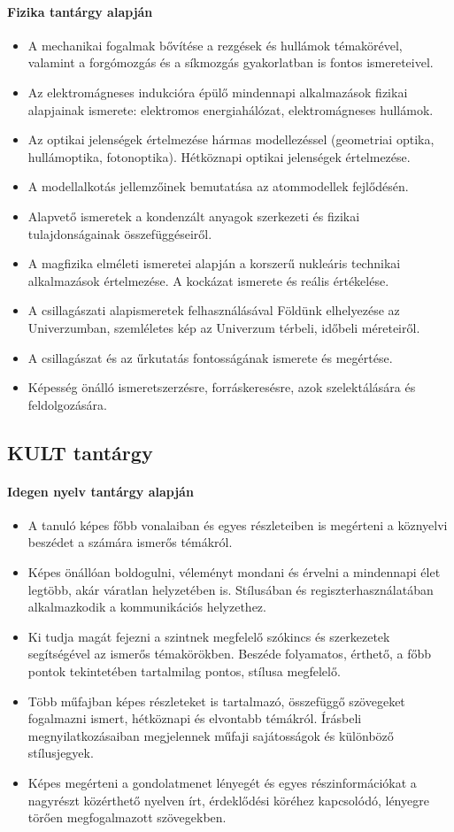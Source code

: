 \paragraph{Fizika tantárgy alapján}
\begin{itemize}
\item A mechanikai fogalmak bővítése a rezgések és hullámok témakörével, valamint a forgómozgás és a síkmozgás gyakorlatban is fontos ismereteivel.
\item Az elektromágneses indukcióra épülő mindennapi alkalmazások fizikai alapjainak ismerete: elektromos energiahálózat, elektromágneses hullámok.
\item Az optikai jelenségek értelmezése hármas modellezéssel (geometriai optika, hullámoptika, fotonoptika). Hétköznapi optikai jelenségek értelmezése.
\item A modellalkotás jellemzőinek bemutatása az atommodellek fejlődésén.
\item Alapvető ismeretek a kondenzált anyagok szerkezeti és fizikai tulajdonságainak összefüggéseiről.
\item A magfizika elméleti ismeretei alapján a korszerű nukleáris technikai alkalmazások értelmezése. A kockázat ismerete és reális értékelése.
\item A csillagászati alapismeretek felhasználásával Földünk elhelyezése az Univerzumban, szemléletes kép az Univerzum térbeli, időbeli méreteiről.
\item A csillagászat és az űrkutatás fontosságának ismerete és megértése.
\item Képesség önálló ismeretszerzésre, forráskeresésre, azok szelektálására és feldolgozására.
\end{itemize}
\subsection{KULT tantárgy}
\paragraph{Idegen nyelv tantárgy alapján}
\begin{itemize}
\item A tanuló képes főbb vonalaiban és egyes részleteiben is megérteni a köznyelvi beszédet a számára ismerős témákról.
\item Képes önállóan boldogulni, véleményt mondani és érvelni a mindennapi élet legtöbb, akár váratlan helyzetében is. Stílusában és regiszterhasználatában alkalmazkodik a kommunikációs helyzethez.
\item Ki tudja magát fejezni a szintnek megfelelő szókincs és szerkezetek segítségével az ismerős témakörökben. Beszéde folyamatos, érthető, a főbb pontok tekintetében tartalmilag pontos, stílusa megfelelő.
\item Több műfajban képes részleteket is tartalmazó, összefüggő szövegeket fogalmazni ismert, hétköznapi és elvontabb témákról. Írásbeli megnyilatkozásaiban megjelennek műfaji sajátosságok és különböző stílusjegyek.
\item Képes megérteni a gondolatmenet lényegét és egyes részinformációkat a nagyrészt közérthető nyelven írt, érdeklődési köréhez kapcsolódó, lényegre törően megfogalmazott szövegekben.
\end{itemize}
